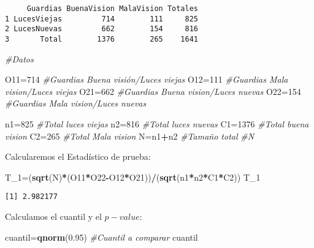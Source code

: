 \documentclass[
  a4paper,
  oneside,
  openany]{book}
\newenvironment{Shaded}{\begin{snugshade}}{\end{snugshade}}
\newcommand{\CommentTok}[1]{\textcolor[rgb]{0.56,0.35,0.01}{\textit{#1}}}
\newcommand{\DecValTok}[1]{\textcolor[rgb]{0.00,0.00,0.81}{#1}}
\newcommand{\FloatTok}[1]{\textcolor[rgb]{0.00,0.00,0.81}{#1}}
\newcommand{\KeywordTok}[1]{\textcolor[rgb]{0.13,0.29,0.53}{\textbf{#1}}}
\newcommand{\NormalTok}[1]{#1}
\newcommand{\OperatorTok}[1]{\textcolor[rgb]{0.81,0.36,0.00}{\textbf{#1}}}
\begin{document}
\begin{verbatim}
     Guardias BuenaVision MalaVision Totales
1 LucesViejas         714        111     825
2 LucesNuevas         662        154     816
3       Total        1376        265    1641
\end{verbatim}

\begin{Shaded}
\begin{Highlighting}[]
\CommentTok{\#Datos}

\NormalTok{O11=}\DecValTok{714}    \CommentTok{\#Guardias Buena visión/Luces viejas}
\NormalTok{O12=}\DecValTok{111}    \CommentTok{\#Guardias Mala vision/Luces viejas}
\NormalTok{O21=}\DecValTok{662}    \CommentTok{\#Guardias Buena vision/Luces nuevas}
\NormalTok{O22=}\DecValTok{154}    \CommentTok{\#Guardias Mala vision/Luces nuevas}

\NormalTok{n1=}\DecValTok{825}      \CommentTok{\#Total luces viejas         }
\NormalTok{n2=}\DecValTok{816}      \CommentTok{\#Total luces nuevas}
\NormalTok{C1=}\DecValTok{1376}     \CommentTok{\#Total buena vision}
\NormalTok{C2=}\DecValTok{265}      \CommentTok{\#Total Mala vision}
\NormalTok{N=n1}\OperatorTok{+}\NormalTok{n2     }\CommentTok{\#Tamaño total }
\CommentTok{\#N}
\end{Highlighting}
\end{Shaded}

Calcularemos el Estadístico de prueba:

\begin{Shaded}
\begin{Highlighting}[]
\NormalTok{T\_}\DecValTok{1}\NormalTok{=(}\KeywordTok{sqrt}\NormalTok{(N)}\OperatorTok{*}\NormalTok{(O11}\OperatorTok{*}\NormalTok{O22}\OperatorTok{{-}}\NormalTok{O12}\OperatorTok{*}\NormalTok{O21))}\OperatorTok{/}\NormalTok{(}\KeywordTok{sqrt}\NormalTok{(n1}\OperatorTok{*}\NormalTok{n2}\OperatorTok{*}\NormalTok{C1}\OperatorTok{*}\NormalTok{C2))}
\NormalTok{T\_}\DecValTok{1}
\end{Highlighting}
\end{Shaded}

\begin{verbatim}
[1] 2.982177
\end{verbatim}

Calculamos el cuantil y el \(p-value\):

\begin{Shaded}
\begin{Highlighting}[]
\NormalTok{cuantil=}\KeywordTok{qnorm}\NormalTok{(}\FloatTok{0.95}\NormalTok{)  }\CommentTok{\#Cuantil a comparar}
\NormalTok{cuantil}
\end{Highlighting}
\end{Shaded}
\end{document}
